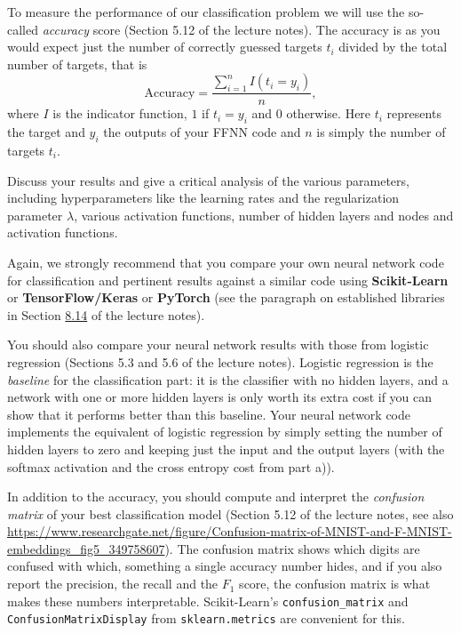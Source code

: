 \documentclass[11pt,a4paper]{article}
\begin{document}
To measure the performance of our classification problem we will use the
so-called \emph{accuracy} score (Section 5.12 of the lecture notes).  The
accuracy is as you would expect just the number of correctly guessed targets
$t_i$ divided by the total number of targets, that is
\[
  \text{Accuracy} = \frac{\sum_{i=1}^n I(t_i = y_i)}{n} ,
\]
where $I$ is the indicator function, $1$ if $t_i = y_i$ and $0$ otherwise.
Here $t_i$ represents the target and $y_i$ the outputs of your FFNN code and
$n$ is simply the number of targets $t_i$.

Discuss your results and give a critical analysis of the various parameters,
including hyperparameters like the learning rates and the regularization
parameter $\lambda$, various activation functions, number of hidden layers
and nodes and activation functions.

Again, we strongly recommend that you compare your own neural network code
for classification and pertinent results against a similar code using
\textbf{Scikit-Learn} or \textbf{TensorFlow/Keras} or \textbf{PyTorch} (see
the paragraph on established libraries in Section
\href{https://educationalmaterialuio.github.io/MachineLearningUiO/doc/LectureNotes/_build/html/chapter8.html#examples}{8.14}
of the lecture notes).

You should also compare your neural network results with those from
logistic regression (Sections 5.3 and 5.6 of the lecture notes).  Logistic
regression is the \emph{baseline} for the classification part: it is the
classifier with no hidden layers, and a network with one or more hidden
layers is only worth its extra cost if you can show that it performs better
than this baseline.  Your neural network code implements the equivalent of
logistic regression by simply setting the number of hidden layers to zero
and keeping just the input and the output layers (with the softmax activation
and the cross entropy cost from part a)).

In addition to the accuracy, you should compute and interpret the
\emph{confusion matrix} of your best classification model (Section 5.12 of
the lecture notes, see also
\url{https://www.researchgate.net/figure/Confusion-matrix-of-MNIST-and-F-MNIST-embeddings_fig5_349758607}).
The confusion matrix shows which digits are confused with which, something a
single accuracy number hides, and if you also report the precision, the
recall and the $F_1$ score, the confusion matrix is what makes these numbers
interpretable.  Scikit-Learn's \texttt{confusion\_matrix} and
\texttt{ConfusionMatrixDisplay} from \texttt{sklearn.metrics} are
convenient for this.
\end{document}
